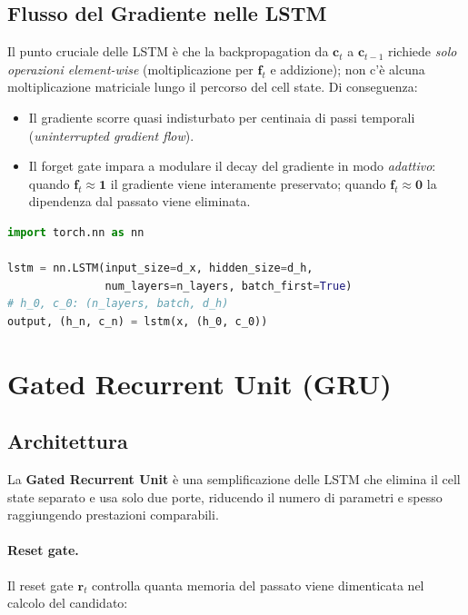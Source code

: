 \subsection{Flusso del Gradiente nelle LSTM}
\label{subsec:lstm-gradient}

Il punto cruciale delle LSTM è che la backpropagation da $\mathbf{c}_t$ a
$\mathbf{c}_{t-1}$ richiede \emph{solo operazioni element-wise} (moltiplicazione
per $\mathbf{f}_t$ e addizione); non c'è alcuna moltiplicazione matriciale lungo
il percorso del cell state. Di conseguenza:

\begin{itemize}
  \item Il gradiente scorre quasi indisturbato per centinaia di passi temporali
        (\emph{uninterrupted gradient flow}).
  \item Il forget gate impara a modulare il decay del gradiente in modo
        \emph{adattivo}: quando $\mathbf{f}_t \approx \mathbf{1}$ il gradiente
        viene interamente preservato; quando $\mathbf{f}_t \approx \mathbf{0}$
        la dipendenza dal passato viene eliminata.
\end{itemize}

\begin{lstlisting}[language=Python, caption={LSTM in PyTorch.}, label={lst:lstm-pytorch}]
import torch.nn as nn

lstm = nn.LSTM(input_size=d_x, hidden_size=d_h,
               num_layers=n_layers, batch_first=True)
# h_0, c_0: (n_layers, batch, d_h)
output, (h_n, c_n) = lstm(x, (h_0, c_0))
\end{lstlisting}

\section{Gated Recurrent Unit (GRU)}
\label{sec:gru}

\subsection{Architettura}
\label{subsec:gru-architecture}

La \textbf{Gated Recurrent Unit} \citep{cho2014gru} è una semplificazione delle
LSTM che elimina il cell state separato e usa solo due porte, riducendo il numero
di parametri e spesso raggiungendo prestazioni comparabili.

\paragraph{Reset gate.}
Il reset gate $\mathbf{r}_t$ controlla quanta memoria del passato viene
dimenticata nel calcolo del candidato:

